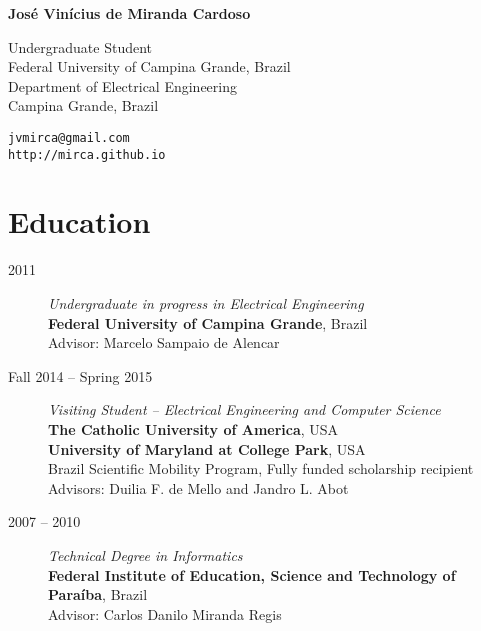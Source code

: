 \documentclass[10pt]{article}
\begin{document}
\pagestyle{empty}
\begin{titlepage}
     {\Large{\textbf{Jos\'e Vin\'icius de Miranda Cardoso}}}
     \vspace{.5cm}

    \begin{minipage}[b]{8cm}
     Undergraduate Student\\
     Federal University of Campina Grande, Brazil\\
     Department of Electrical Engineering\\
     Campina Grande, Brazil
    \end{minipage}
    \hspace{4cm}
    \begin{minipage}[b]{4cm}
        \texttt{jvmirca@gmail.com}\\ \texttt{http://mirca.github.io}
    \end{minipage}


\section*{Education}

\begin{description}
 \item[2011] \emph{Undergraduate in progress in Electrical Engineering} \\\textbf{Federal University of Campina Grande}, Brazil\\ Advisor: Marcelo Sampaio de Alencar
 \item[Fall 2014 -- Spring 2015] \emph{Visiting Student -- Electrical Engineering and Computer Science} \\\textbf{The Catholic University of America}, USA\\
\textbf{University of Maryland at College Park}, USA \\ Brazil Scientific Mobility
 Program, Fully funded scholarship recipient \\ Advisors: Duilia F. de Mello and Jandro L. Abot
 \item[2007 -- 2010] \emph{Technical Degree in Informatics} \\ \textbf{Federal Institute of Education, Science and Technology of Para\'iba}, Brazil \\ Advisor: Carlos Danilo Miranda Regis
\end{description}


\end{titlepage}
\end{document}
